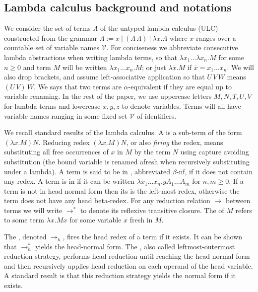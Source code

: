 \documentclass{elsarticle}
\theoremstyle{plain}
\theoremstyle{definition}
\newcommand\VarSet{\mathcal{V}}
\begin{document}
\subsection{Lambda calculus background and notations}
\label{sec:lambdacalculus_basics}

We consider the set of terms $\Lambda$ of the untyped lambda calculus (ULC) constructed from the grammar $\Lambda := x\ |\ (\Lambda\, \Lambda)\ |\ \lambda x. \Lambda $
where $x$ ranges over a countable set of variable names $\VarSet$.
For conciseness we abbreviate consecutive lambda abstractions when writing lambda terms, so that $\lambda x_1 \ldots \lambda x_n . M$ for some $n\geq 0$ and term $M$ will be written $\lambda x_1 \ldots x_n . M$; or just
$\lambda \overline{x} . M$ if $\overline{x} = x_1 \ldots x_n$.
We will also drop brackets, and assume left-associative application so that $U\,V\,W$ means $(U\,V)\,W$. We says that two terms are $\alpha$-equivalent if they are equal up to variable renaming.
In the rest of the paper, we use uppercase letters $M, N, T, U, V$ for lambda terms and lowercase $x,y,z$ to denote variables. Terms will all have variable names ranging in some fixed set $\VarSet$ of identifiers.

We recall standard results of the lambda calculus.
A  is a sub-term of the form $(\lambda x. M) N$.
Reducing redex $(\lambda x. M) N$, or also \emph{firing} the redex, means substituting all free occurrences of $x$ in $M$ by the term $N$ using capture avoiding substitution (the bound variable is renamed afresh when recursively substituting under a lambda).
A term is said to be in , abbreviated $\beta$-nf, if it does not contain any redex.
A term is in  if it can be written $\lambda x_1 \ldots x_n . y A_1 \ldots A_m$ for $n,m\geq0$. If a term is not in head normal form then its  is the left-most redex, otherwise the term does not have any head beta-redex. For any reduction relation $\rightarrow$ between terms we will write $\rightarrow^*$ to denote its reflexive transitive closure. The  of $M$ refers to some term $\lambda x. M x $ for some variable $x$ fresh in $M$.

The , denoted $\rightarrow_{h}$, fires the head redex of a term if it exists. It can be shown that $\rightarrow^*_{h}$ yields the head-normal form. The , also called leftmost-outermost reduction strategy, performs head reduction until reaching the head-normal form and then recursively applies head reduction on each operand of the head variable. A standard result is that this reduction strategy yields the normal form if it exists.
\end{document}
